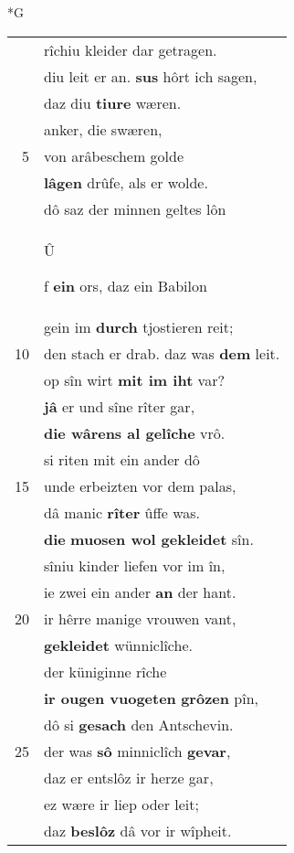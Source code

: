\documentclass[8pt,a4paper,notitlepage]{article}
\begin{document}
\begin{table}[ht]
\begin{minipage}[t]{0.5\linewidth}
\small
\begin{center}*G
\end{center}
\begin{tabular}{rl}
 & rîchiu kleider dar getragen.\\ 
 & diu leit er an. \textbf{sus} hôrt ich sagen,\\ 
 & daz diu \textbf{tiure} wæren.\\ 
 & anker, die swæren,\\ 
5 & von arâbeschem golde\\ 
 & \textbf{lâgen} drûfe, als er wolde.\\ 
 & dô saz der minnen geltes lôn\\ 
 & \begin{large}Û\end{large}f \textbf{ein} ors, daz ein Babilon\\ 
 & gein im \textbf{durch} tjostieren reit;\\ 
10 & den stach er drab. daz was \textbf{dem} leit.\\ 
 & op sîn wirt \textbf{mit im iht} var?\\ 
 & \textbf{jâ} er und sîne rîter gar,\\ 
 & \textbf{die wârens al gelîche} vrô.\\ 
 & si riten mit ein ander dô\\ 
15 & unde erbeizten vor dem palas,\\ 
 & dâ manic \textbf{rîter} ûffe was.\\ 
 & \textbf{die} \textbf{muosen wol gekleidet} sîn.\\ 
 & sîniu kinder liefen vor im în,\\ 
 & ie zwei ein ander \textbf{an} der hant.\\ 
20 & ir hêrre manige vrouwen vant,\\ 
 & \textbf{gekleidet} wünniclîche.\\ 
 & der küniginne rîche\\ 
 & \textbf{ir ougen vuogeten} \textbf{grôzen} pîn,\\ 
 & dô si \textbf{gesach} den Antschevin.\\ 
25 & der was \textbf{sô} minniclîch \textbf{gevar},\\ 
 & daz er entslôz ir herze gar,\\ 
 & ez wære ir liep oder leit;\\ 
 & daz \textbf{beslôz} dâ vor ir wîpheit.\\ 

\end{tabular}
\end{minipage}
\end{table}
\end{document}
